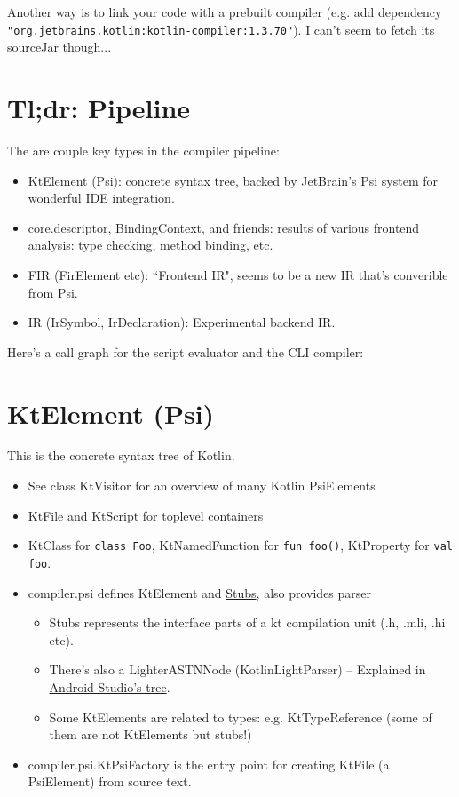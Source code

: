 \documentclass{article}
\begin{document}
Another way is to link your code with a prebuilt compiler (e.g. add dependency \texttt{"org.jetbrains.kotlin:kotlin-compiler:1.3.70"}). I can't seem to fetch its sourceJar though...

\section{Tl;dr: Pipeline}

The are couple key types in the compiler pipeline:

\begin{itemize}
    \item KtElement (Psi): concrete syntax tree, backed by JetBrain's Psi system for wonderful IDE integration.
    \item core.descriptor, BindingContext, and friends: results of various frontend analysis: type checking, method binding, etc.
    \item FIR (FirElement etc): ``Frontend IR", seems to be a new IR that's converible from Psi.
    \item IR (IrSymbol, IrDeclaration): Experimental backend IR.
\end{itemize}

Here's a call graph for the script evaluator and the CLI compiler:
\begin{dot2tex}[dot,scale=0.3]

\end{dot2tex}

\section{KtElement (Psi)}

This is the concrete syntax tree of Kotlin.

\begin{itemize}
    \item See class KtVisitor for an overview of many Kotlin PsiElements
    \item KtFile and KtScript for toplevel containers
    \item KtClass for \texttt{class Foo}, KtNamedFunction for \texttt{fun foo()}, KtProperty for \texttt{val foo}.
    \item compiler.psi defines KtElement and \href{https://www.jetbrains.org/intellij/sdk/docs/basics/indexing_and_psi_stubs/stub_indexes.html}{Stubs}, also provides parser
    \begin{itemize}
        \item Stubs represents the interface parts of a kt compilation unit
        (.h, .mli, .hi etc).
        \item There's also a LighterASTNNode (KotlinLightParser) -- Explained in \href{https://github.com/JetBrains/android/blob/230f7af2/android/docs/kotlin-light-classes.md}{Android Studio's tree}.
        \item Some KtElements are related to types: e.g. KtTypeReference (some of them are not KtElements but stubs!)
    \end{itemize}
    \item compiler.psi.KtPsiFactory is the entry point for creating KtFile (a PsiElement) from source text.
\end{itemize}
\end{document}
